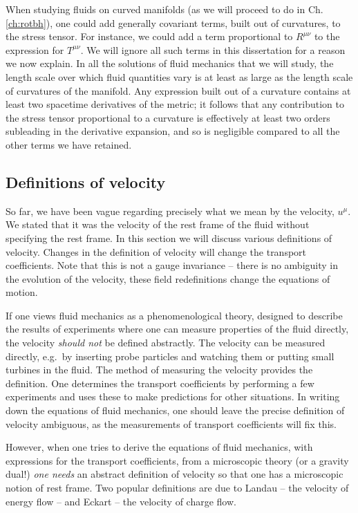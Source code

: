 When studying fluids on curved manifolds (as we will proceed to do in Ch.\ref{ch:rotbh}), one could add generally covariant terms, built out of curvatures, to the stress tensor. For instance, we could add a term proportional to $R^{\mu \nu}$ to the expression for $T^{\mu\nu}$. We will ignore all such terms in this dissertation for a reason we now explain. In all the solutions of fluid mechanics that we will study, the length scale over which fluid quantities vary is at least as large as the length scale of curvatures of the manifold. Any expression built out of a curvature contains at least two spacetime derivatives of the metric; it follows that any contribution to the stress tensor proportional to a curvature is effectively at least two orders subleading in the derivative expansion, and so is negligible compared to all the other terms we have retained.

\subsection{Definitions of velocity}\label{sec:velocity}

So far, we have been vague regarding precisely what we mean by the velocity, $u^\mu$. We stated that it was the velocity of the rest frame of the fluid without specifying the rest frame. In this section we will discuss various definitions of velocity. Changes in the definition of velocity will change the transport coefficients. Note that this is not a gauge invariance -- there is no ambiguity in the evolution of the velocity, these field redefinitions change the equations of motion.

If one views fluid mechanics as a phenomenological theory, designed to describe the results of experiments where one can measure properties of the fluid directly, the velocity \emph{should not} be defined abstractly. The velocity can be measured directly, e.g.\ by inserting probe particles and watching them or putting small turbines in the fluid. The method of measuring the velocity provides the definition. One determines the transport coefficients by performing a few experiments and uses these to make predictions for other situations. In writing down the equations of fluid mechanics, one should leave the precise definition of velocity ambiguous, as the measurements of transport coefficients will fix this.

However, when one tries to derive the equations of fluid mechanics, with expressions for the transport coefficients, from a microscopic theory (or a gravity dual!) \emph{one needs} an abstract definition of velocity so that one has a microscopic notion of rest frame. Two popular definitions are due to Landau \cite{Landau+Lifshitz-FluiMech:59} -- the velocity of energy flow -- and Eckart \cite{Eckart-TherIrreProc:40} -- the velocity of charge flow.

